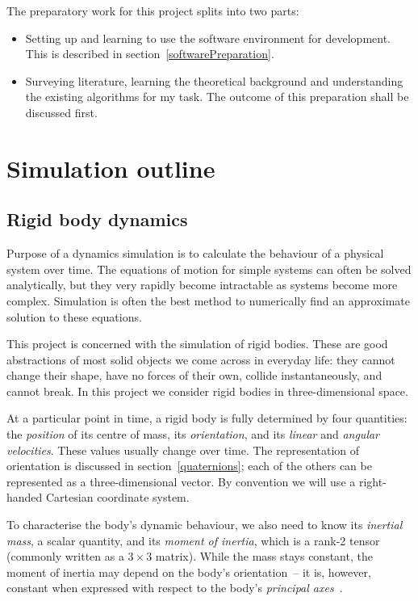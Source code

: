 The preparatory work for this project splits into two parts:
\begin{itemize}
\item Setting up and learning to use the software environment for development. This is described
    in section~\ref{softwarePreparation}.
\item Surveying literature, learning the theoretical background and understanding the existing
    algorithms for my task. The outcome of this preparation shall be discussed first.
\end{itemize}

\section{Simulation outline}

\subsection{Rigid body dynamics}

Purpose of a dynamics simulation is to calculate the behaviour of a physical system over time.
The equations of motion for simple systems can often be solved analytically, but they very
rapidly become intractable as systems become more complex. Simulation is often the best
method to numerically find an approximate solution to these equations.

This project is concerned with the simulation of rigid bodies. These are good abstractions of
most solid objects we come across in everyday life: they cannot change their shape, have no
forces of their own, collide instantaneously, and cannot break. In this project we consider
rigid bodies in three-dimensional space.

At a particular point in time, a rigid body is fully determined by four quantities: the
\emph{position} of its centre of mass, its \emph{orientation}, and its \emph{linear} and
\emph{angular velocities}. These values usually change over time. The representation of
orientation is discussed in section~\ref{quaternions}; each of the others can be
represented as a three-dimensional vector. By convention we will use a right-handed Cartesian
coordinate system.

To characterise the body's dynamic behaviour, we also need to know its \emph{inertial mass},
a scalar quantity, and its \emph{moment of inertia}, which is a rank-2 tensor (commonly written
as a $3\times3$ matrix). While the mass stays constant, the moment of inertia may
depend on the body's orientation~-- it is, however, constant when expressed with respect to the
body's \emph{principal axes}~\cite{Feynman:63}.

